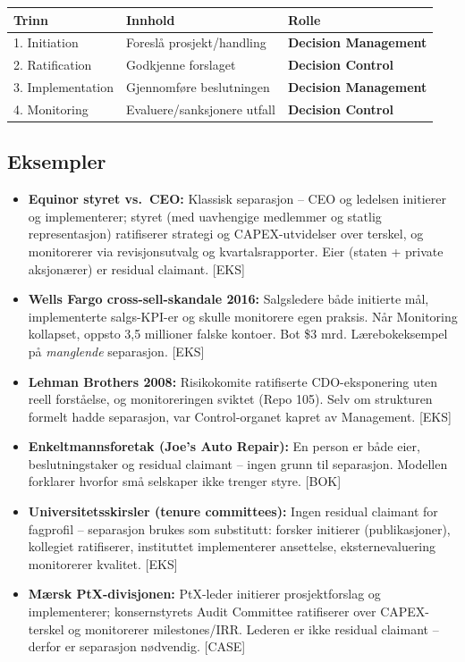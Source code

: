 \begin{center}
\renewcommand{\arraystretch}{1.2}
\begin{tabular}{@{}p{2.3cm}p{5.0cm}p{5.5cm}@{}}
\toprule
\textbf{Trinn} & \textbf{Innhold} & \textbf{Rolle} \\
\midrule
1. Initiation & Foreslå prosjekt/handling & \textbf{Decision Management} \\
2. Ratification & Godkjenne forslaget & \textbf{Decision Control} \\
3. Implementation & Gjennomføre beslutningen & \textbf{Decision Management} \\
4. Monitoring & Evaluere/sanksjonere utfall & \textbf{Decision Control} \\
\bottomrule
\end{tabular}
\end{center}

\subsection*{Eksempler}
\begin{itemize}
\item \textbf{Equinor styret vs.\ CEO:} Klassisk separasjon -- CEO og ledelsen initierer og implementerer; styret (med uavhengige medlemmer og statlig representasjon) ratifiserer strategi og CAPEX-utvidelser over terskel, og monitorerer via revisjonsutvalg og kvartalsrapporter. Eier (staten + private aksjonærer) er residual claimant. [EKS]
\item \textbf{Wells Fargo cross-sell-skandale 2016:} Salgsledere både initierte mål, implementerte salgs-KPI-er og skulle monitorere egen praksis. Når Monitoring kollapset, oppsto 3,5 millioner falske kontoer. Bot \$3 mrd. Lærebokeksempel på \emph{manglende} separasjon. [EKS]
\item \textbf{Lehman Brothers 2008:} Risikokomite ratifiserte CDO-eksponering uten reell forståelse, og monitoreringen sviktet (Repo 105). Selv om strukturen formelt hadde separasjon, var Control-organet kapret av Management. [EKS]
\item \textbf{Enkeltmannsforetak (Joe's Auto Repair):} En person er både eier, beslutningstaker og residual claimant -- ingen grunn til separasjon. Modellen forklarer hvorfor små selskaper ikke trenger styre. [BOK]
\item \textbf{Universitetsskirsler (tenure committees):} Ingen residual claimant for fagprofil -- separasjon brukes som substitutt: forsker initierer (publikasjoner), kollegiet ratifiserer, instituttet implementerer ansettelse, eksternevaluering monitorerer kvalitet. [EKS]
\item \textbf{Mærsk PtX-divisjonen:} PtX-leder initierer prosjektforslag og implementerer; konsernstyrets Audit Committee ratifiserer over CAPEX-terskel og monitorerer milestones/IRR. Lederen er ikke residual claimant -- derfor er separasjon nødvendig. [CASE]
\end{itemize}

